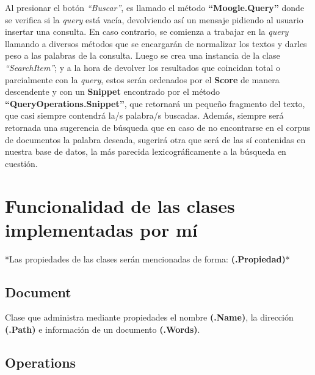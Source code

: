 \documentclass[a4paper,12pt]{article}
\begin{document}
\begin{center}
 Al presionar el botón \emph{“Buscar”}, es llamado el método \textbf{“Moogle.Query”} donde se verifica si la \emph{query}
 está vacía, devolviendo así un mensaje pidiendo al usuario insertar una consulta. En caso contrario, 
 se comienza a trabajar en la \emph{query} llamando a diversos métodos que se encargarán de normalizar los textos
 y darles peso a las palabras de la consulta. Luego se crea una instancia de la clase \emph{“SearchItem”}; y a la
 hora de devolver los resultados que coincidan total o parcialmente con la \emph{query}, estos serán ordenados por
 el \textbf{Score} de manera descendente y con un \textbf{Snippet} encontrado por el método \textbf{“QueryOperations.Snippet”},
 que retornará un pequeño fragmento del texto, que casi siempre contendrá la/s palabra/s buscadas. Además, 
 siempre será retornada una sugerencia de búsqueda que en caso de no encontrarse en el corpus de documentos
 la palabra deseada, sugerirá otra que será de las sí contenidas en nuestra base de datos, la más parecida
 lexicográficamente a la búsqueda en cuestión.

 

 \newpage 

 
 \section{Funcionalidad de las clases implementadas por mí}

    *Las propiedades de las clases serán mencionadas de forma: \textbf{(.Propiedad)}*
 

 \subsection{Document}

 Clase que administra mediante propiedades el nombre \textbf{(.Name)}, la dirección \textbf{(.Path)} e información 
 de un documento \textbf{(.Words)}.

 \subsection{Operations}\label{sub:Ope}


\end{center}
\end{document}
